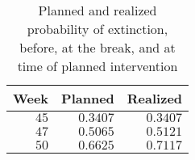 \begin{table}[!tbp]
\caption{Planned and realized probability of extinction, before, at the break, and
      at time of planned intervention\label{tab:min}} 
\begin{center}
\begin{tabular}{rrr}
\hline\hline
\multicolumn{1}{c}{Week}&\multicolumn{1}{c}{Planned}&\multicolumn{1}{c}{Realized}\tabularnewline
\hline
$45$&$0.3407$&$0.3407$\tabularnewline
$47$&$0.5065$&$0.5121$\tabularnewline
$50$&$0.6625$&$0.7117$\tabularnewline
\hline
\end{tabular}\end{center}
\end{table}
